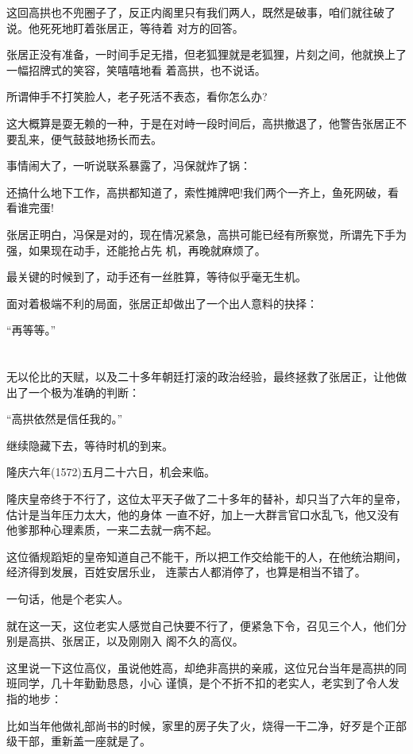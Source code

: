 \documentclass[11pt,a4paper,onecolumn]{article}
\begin{document}
这回高拱也不兜圈子了，反正内阁里只有我们两人，既然是破事，咱们就往破了说。他死死地盯着张居正，等待着
对方的回答。

张居正没有准备，一时间手足无措，但老狐狸就是老狐狸，片刻之间，他就换上了一幅招牌式的笑容，笑嘻嘻地看
着高拱，也不说话。

所谓伸手不打笑脸人，老子死活不表态，看你怎么办?

这大概算是耍无赖的一种，于是在对峙一段时间后，高拱撤退了，他警告张居正不要乱来，便气鼓鼓地扬长而去。

事情闹大了，一听说联系暴露了，冯保就炸了锅：

还搞什么地下工作，高拱都知道了，索性摊牌吧!我们两个一齐上，鱼死网破，看看谁完蛋!

张居正明白，冯保是对的，现在情况紧急，高拱可能已经有所察觉，所谓先下手为强，如果现在动手，还能抢占先
机，再晚就麻烦了。

最关键的时候到了，动手还有一丝胜算，等待似乎毫无生机。

面对着极端不利的局面，张居正却做出了一个出人意料的抉择：

``再等等。''

\section[\thesection]{}

无以伦比的天赋，以及二十多年朝廷打滚的政治经验，最终拯救了张居正，让他做出了一个极为准确的判断：

``高拱依然是信任我的。''

继续隐藏下去，等待时机的到来。

隆庆六年(1572)五月二十六日，机会来临。

隆庆皇帝终于不行了，这位太平天子做了二十多年的替补，却只当了六年的皇帝，估计是当年压力太大，他的身体
一直不好，加上一大群言官口水乱飞，他又没有他爹那种心理素质，一来二去就一病不起。

这位循规蹈矩的皇帝知道自己不能干，所以把工作交给能干的人，在他统治期间，经济得到发展，百姓安居乐业，
连蒙古人都消停了，也算是相当不错了。

一句话，他是个老实人。

就在这一天，这位老实人感觉自己快要不行了，便紧急下令，召见三个人，他们分别是高拱、张居正，以及刚刚入
阁不久的高仪。

这里说一下这位高仪，虽说他姓高，却绝非高拱的亲戚，这位兄台当年是高拱的同班同学，几十年勤勤恳恳，小心
谨慎，是个不折不扣的老实人，老实到了令人发指的地步：

比如当年他做礼部尚书的时候，家里的房子失了火，烧得一干二净，好歹是个正部级干部，重新盖一座就是了。
\end{document}
